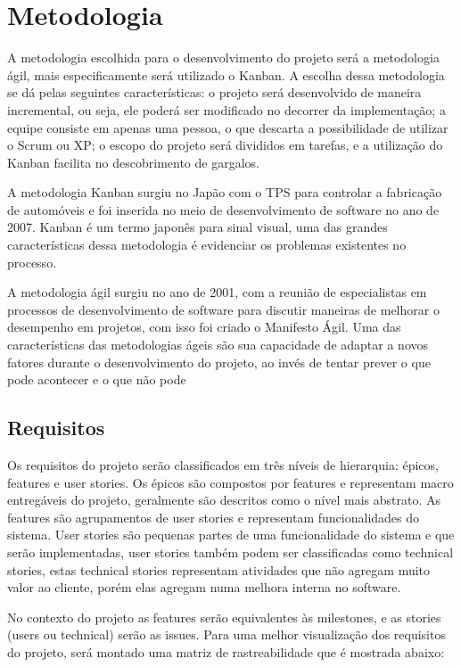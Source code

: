\chapter[Metodologia]{Metodologia}
A metodologia escolhida para o desenvolvimento do projeto será a metodologia ágil, mais especificamente será utilizado o Kanban. A escolha dessa metodologia se dá pelas seguintes características: o projeto será desenvolvido de maneira incremental, ou seja, ele poderá ser modificado no decorrer da implementação; a equipe consiste em apenas uma pessoa, o que descarta a possibilidade de utilizar o Scrum ou XP; o escopo do projeto será divididos em tarefas, e a utilização do Kanban facilita no descobrimento de gargalos.

A metodologia Kanban surgiu no Japão com o TPS\cite{tps} para controlar a fabricação de automóveis e foi inserida no meio de desenvolvimento de software no ano de 2007. Kanban é um termo japonês para sinal visual, uma das grandes características dessa metodologia é evidenciar os problemas existentes no processo. 

A metodologia ágil surgiu no ano de 2001, com a reunião de especialistas em processos de desenvolvimento de software para discutir maneiras de melhorar o desempenho em projetos, com isso foi criado o Manifesto Ágil. Uma das características das metodologias ágeis são sua capacidade de adaptar a novos fatores durante o desenvolvimento do projeto, ao invés de tentar prever o que pode acontecer e o que não pode
\section{Requisitos}
Os requisitos do projeto serão classificados em três níveis de hierarquia:  épicos, features e user stories. Os épicos são compostos por features e representam macro entregáveis do projeto, geralmente são descritos como o nível mais abstrato. As features são agrupamentos de user stories e representam funcionalidades do sistema. User stories são pequenas partes de uma funcionalidade do sistema e que serão implementadas, user stories também podem ser classificadas como technical stories, estas technical stories representam atividades que não agregam muito valor ao cliente, porém elas agregam numa melhora interna no software.

No contexto do projeto as features serão equivalentes às milestones, e as stories (users ou technical) serão as issues. Para uma melhor visualização dos requisitos do projeto, será montado uma matriz de rastreabilidade que é mostrada abaixo:
